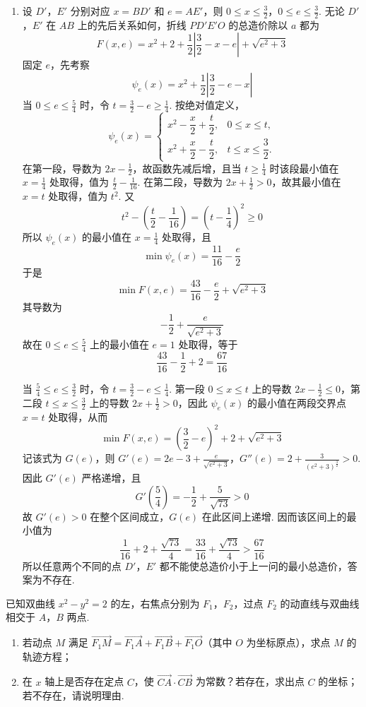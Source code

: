 \begin{solution}
\begin{enumerate}
\item
设 \(D'\)，\(E'\) 分别对应 \(x=BD'\) 和 \(e=AE'\)，则
\(0\leqslant x\leqslant\frac{3}{2}\)，\(0\leqslant e\leqslant\frac{3}{2}\).
无论 \(D'\)，\(E'\) 在 \(AB\) 上的先后关系如何，折线 \(PD'E'O\) 的总造价除以 \(a\) 都为
\[
F(x,e)=x^2+2+\frac{1}{2}\left|\frac{3}{2}-x-e\right|+\sqrt{e^2+3}
\]
固定 \(e\)，先考察
\[
\psi_e(x)=x^2+\frac{1}{2}\left|\frac{3}{2}-e-x\right|
\]
当 \(0\leqslant e\leqslant\frac{5}{4}\) 时，令 \(t=\frac{3}{2}-e\geqslant\frac{1}{4}\). 按绝对值定义，
\[
\psi_e(x)=
\begin{cases}
x^2-\dfrac{x}{2}+\dfrac{t}{2}, & 0\leqslant x\leqslant t,\\
x^2+\dfrac{x}{2}-\dfrac{t}{2}, & t\leqslant x\leqslant\dfrac{3}{2}.
\end{cases}
\]
在第一段，导数为 \(2x-\frac12\)，故函数先减后增，且当 \(t\geqslant\frac14\) 时该段最小值在 \(x=\frac14\) 处取得，值为 \(\frac{t}{2}-\frac{1}{16}\). 在第二段，导数为 \(2x+\frac12>0\)，故其最小值在 \(x=t\) 处取得，值为 \(t^2\). 又
\[
t^2-\left(\frac{t}{2}-\frac{1}{16}\right)=\left(t-\frac14\right)^2\geqslant0
\]
所以 \(\psi_e(x)\) 的最小值在 \(x=\frac{1}{4}\) 处取得，且
\[
\min\psi_e(x)=\frac{11}{16}-\frac{e}{2}
\]
于是
\[
\min F(x,e)=\frac{43}{16}-\frac{e}{2}+\sqrt{e^2+3}
\]
其导数为
\[
-\frac{1}{2}+\frac{e}{\sqrt{e^2+3}}
\]
故在 \(0\leqslant e\leqslant\frac{5}{4}\) 上的最小值在 \(e=1\) 处取得，等于
\[
\frac{43}{16}-\frac{1}{2}+2=\frac{67}{16}
\]

当 \(\frac{5}{4}\leqslant e\leqslant\frac{3}{2}\) 时，令 \(t=\frac{3}{2}-e\leqslant\frac{1}{4}\). 第一段 \(0\leqslant x\leqslant t\) 上的导数 \(2x-\frac12\leqslant0\)，第二段 \(t\leqslant x\leqslant\frac32\) 上的导数 \(2x+\frac12>0\)，因此 \(\psi_e(x)\) 的最小值在两段交界点 \(x=t\) 处取得，从而
\[
\min F(x,e)=\left(\frac{3}{2}-e\right)^2+2+\sqrt{e^2+3}
\]
记该式为 \(G(e)\)，则
\(G'(e)=2e-3+\frac{e}{\sqrt{e^2+3}}\)，\(G''(e)=2+\frac{3}{(e^2+3)^{\frac{3}{2}}}>0\).
因此 \(G'(e)\) 严格递增，且
\[
G'\left(\frac54\right)=-\frac12+\frac{5}{\sqrt{73}}>0
\]
故 \(G'(e)>0\) 在整个区间成立，\(G(e)\) 在此区间上递增. 因而该区间上的最小值为
\[
\frac{1}{16}+2+\frac{\sqrt{73}}{4}
=\frac{33}{16}+\frac{\sqrt{73}}{4}
>\frac{67}{16}
\]
所以任意两个不同的点 \(D'\)，\(E'\) 都不能使总造价小于上一问的最小总造价，答案为不存在.
\end{enumerate}
\end{solution}

\begin{problem}
已知双曲线 \(x^{2} - y^{2} = 2\) 的左，右焦点分别为 \(F_{1}\)，\(F_{2}\)，过点 \(F_{2}\) 的动直线与双曲线相交于 \(A\)，\(B\) 两点.

\begin{enumerate}
\item 若动点 \(M\) 满足 \(\overrightarrow{F_{1}M} = \overrightarrow{F_{1}A} + \overrightarrow{F_{1}B} + \overrightarrow{F_{1}O}\)（其中 \(O\) 为坐标原点），求点 \(M\) 的轨迹方程；
\item 在 \(x\) 轴上是否存在定点 \(C\)，使 \(\overrightarrow{CA} \cdot \overrightarrow{CB}\) 为常数？若存在，求出点 \(C\) 的坐标；若不存在，请说明理由.
\end{enumerate}
\end{problem}

